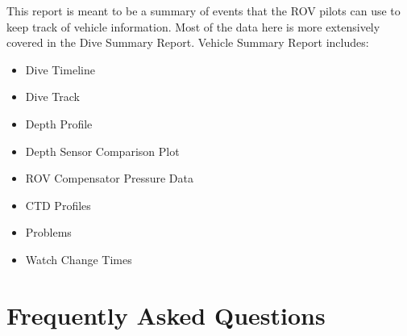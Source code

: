 \documentclass[
  letterpaper,
  DIV=11,
  numbers=noendperiod]{scrreprt}
\providecommand{\tightlist}{%
  \setlength{\itemsep}{0pt}\setlength{\parskip}{0pt}}\usepackage{longtable,booktabs,array}
\begin{document}
This report is meant to be a summary of events that the ROV pilots can
use to keep track of vehicle information. Most of the data here is more
extensively covered in the Dive Summary Report. Vehicle Summary Report
includes:

\begin{itemize}
\tightlist
\item
  Dive Timeline
\item
  Dive Track
\item
  Depth Profile
\item
  Depth Sensor Comparison Plot
\item
  ROV Compensator Pressure Data
\item
  CTD Profiles
\item
  Problems
\item
  Watch Change Times
\end{itemize}

\hypertarget{frequently-asked-questions}{%
\section{Frequently Asked Questions}\label{frequently-asked-questions}}
\end{document}
